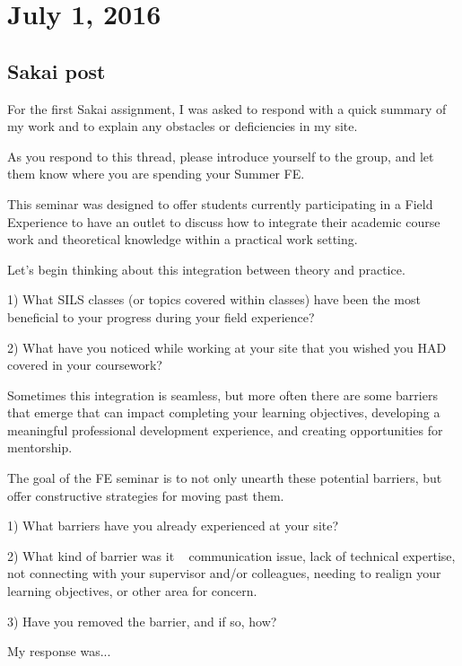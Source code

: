 \documentclass{article}
\begin{document}
\section{July 1, 2016}
\subsection{Sakai post}
For the first Sakai assignment, I was asked to respond with a quick summary of my work and to explain any obstacles or deficiencies in my site.

\begin{displayquote}
As you respond to this thread, please introduce yourself to the group, and let them know where you are spending your Summer FE.

This seminar was designed to offer students currently participating in a Field Experience to have an outlet to discuss how to integrate their academic course work and theoretical knowledge within a practical work setting. 

Let's begin thinking about this integration between theory and practice. 

1) What SILS classes (or topics covered within classes) have been the most beneficial to your progress during your field experience?

2) What have you noticed while working at your site that you wished you HAD covered in your coursework?

Sometimes this integration is seamless, but more often there are some barriers that emerge that can impact completing your learning objectives, developing a meaningful professional development experience, and creating opportunities for mentorship.

The goal of the FE seminar is to not only unearth these potential barriers, but offer constructive strategies for moving past them.

1) What barriers have you already experienced at your site? 

2) What kind of barrier was it ~ communication issue, lack of technical expertise, not connecting with your supervisor and/or colleagues, needing to realign your learning objectives, or other area for concern.

3) Have you removed the barrier, and if so, how?
\end{displayquote}
\noindent My response was...
\end{document}
